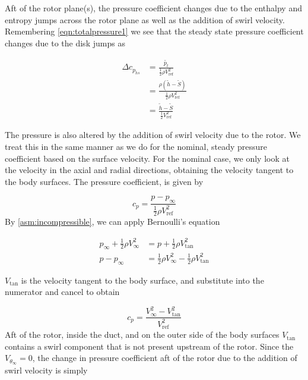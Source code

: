 Aft of the rotor plane(s), the pressure coefficient changes due to the enthalpy and entropy jumps across the rotor plane as well as the addition of swirl velocity.
%
Remembering \cref{eqn:totalpressure1} we see that the steady state pressure coefficient changes due to the disk jumps as

\begin{equation}
    \begin{aligned}
        \Delta c_{p_{hs}} &= \frac{\widetilde{p_t}}{\frac{1}{2} \rho V_\text{ref}^2} \\
                          &= \frac{\rho \left(\widetilde{h}-\widetilde{S} \right)}{\frac{1}{2} \rho V_\text{ref}^2} \\
                          &= \frac{\widetilde{h}-\widetilde{S}}{\frac{1}{2} V_\text{ref}^2}
    \end{aligned}
\end{equation}

\noindent The pressure is also altered by the addition of swirl velocity due to the rotor.
%
We treat this in the same manner as we do for the nominal, steady pressure coefficient based on the surface velocity.
%
For the nominal case, we only look at the velocity in the axial and radial directions, obtaining the velocity tangent to the body surfaces.
%
The pressure coefficient, is given by

\begin{equation}
    c_p = \frac{p - p_\infty}{\frac{1}{2} \rho V_\text{ref}^2}
\end{equation}
%
By \cref{asm:incompressible}, we can apply Bernoulli's equation

\begin{align}
    p_\infty + \frac{1}{2} \rho V_\infty^2 &= p + \frac{1}{2} \rho V_\text{tan}^2 \\
    p-p_\infty &= \frac{1}{2} \rho V_\infty^2 - \frac{1}{2} \rho V_\text{tan}^2
\end{align}

\where \(V_\text{tan}\) is the velocity tangent to the body surface, and substitute into the numerator and cancel to obtain

\begin{equation}
    c_p = \frac{V_\infty^2 - V_\text{tan}^2}{V_\text{ref}^2}
\end{equation}
%
Aft of the rotor, inside the duct, and on the outer side of the body surfaces \(V_\text{tan}\) contains a swirl component that is not present upstream of the rotor.
%
Since the \(V_{\theta_\infty}=0\), the change in pressure coefficient aft of the rotor due to the addition of swirl velocity is simply

